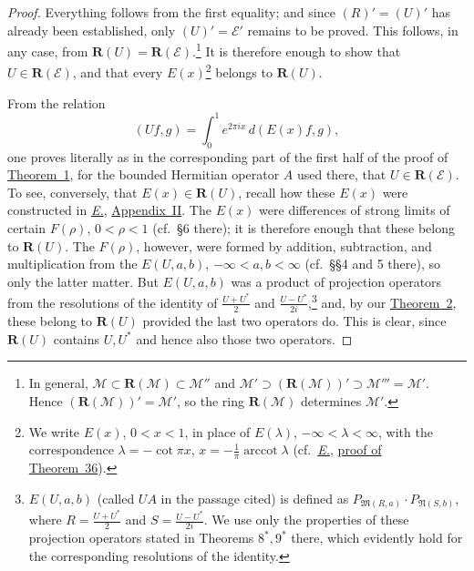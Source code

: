\documentclass[
  paper=b5,
  twoside=true,
  fontsize=13pt,
  headings=normal,
  bookmarkpackage=false
]{scrartcl}
\theoremstyle{definition}
\newcommand{\TheoremRef}[1]{\hyperref[thm:#1]{Theorem~#1}}
\newcommand{\Eref}{\hyperref[fn:E-paper]{\emph{E.}}}
\newcommand{\ErefText}[1]{\href{https://doi.org/10.1007/BF01782338}{#1}}
\newcommand{\GeneratedRing}{\boldsymbol{R}}
\begin{document}
\begin{proof}
Everything follows from the first equality; and since
\((R)'=(U)'\) has already been established, only
\((U)'=\mathcal E'\) remains to be proved.  This follows, in any case,
from \(\GeneratedRing (U)=\GeneratedRing (\mathcal E)\).\footnote{\label{fn:63}In general,
\(\mathcal M\subset \GeneratedRing (\mathcal M)\subset\mathcal M''\) and
\(\mathcal M'\supset(\GeneratedRing (\mathcal M))'\supset\mathcal M'''=\mathcal M'\).
Hence \((\GeneratedRing (\mathcal M))'=\mathcal M'\), so the ring \(\GeneratedRing (\mathcal M)\)
determines \(\mathcal M'\).}
It is therefore enough to show that \(U\in \GeneratedRing (\mathcal E)\), and that
every \(E(x)\)\footnote{\label{fn:64}We write \(E(x)\), \(0<x<1\), in place of
\(E(\lambda)\), \(-\infty<\lambda<\infty\), with the correspondence
\(\lambda=-\cot\pi x\),
\(x=-\frac1\pi\operatorname{arccot}\lambda\)
(cf.\ \Eref, \ErefText{proof of Theorem~36}).} belongs to \(\GeneratedRing (U)\).

From the relation
\[
  (Uf,g)=\int_0^1e^{2\pi ix}\,d(E(x)f,g),
\]
one proves literally as in the corresponding part of the first half of
the proof of \TheoremRef{1}, for the bounded Hermitian operator \(A\) used
there, that \(U\in \GeneratedRing (\mathcal E)\).  To see, conversely, that
\(E(x)\in \GeneratedRing (U)\), recall how these \(E(x)\) were constructed in
\Eref, \ErefText{Appendix~II}.  The \(E(x)\) were differences
of strong limits of certain \(F(\rho)\), \(0<\rho<1\)
(cf.\ \S6 there); it is therefore enough that these belong to \(\GeneratedRing (U)\).
The \(F(\rho)\), however, were formed by addition, subtraction, and
multiplication from the \(E(U,a,b)\),
\(-\infty<a,b<\infty\) (cf.\ \S\S4 and 5 there), so only the latter
matter.  But \(E(U,a,b)\) was a product of projection operators from the
resolutions of the identity of \(\frac{U+U^*}{2}\) and
\(\frac{U-U^*}{2i}\),\footnote{\label{fn:65}\(E(U,a,b)\) (called
\(UA\) in the passage cited) is defined as
\(P_{\mathfrak{M}(R,a)}\cdot P_{\mathfrak{N}(S,b)}\), where
\(R=\frac{U+U^*}{2}\) and \(S=\frac{U-U^*}{2i}\). We use only the
properties of these projection operators stated in Theorems \(8^*,9^*\)
there, which evidently hold for the corresponding resolutions of the
identity.} and, by our \TheoremRef{2}, these belong to \(\GeneratedRing (U)\) provided the last two
operators do. This is clear, since \(\GeneratedRing (U)\) contains \(U,U^*\) and
hence also those two operators.
\end{proof}
\end{document}
